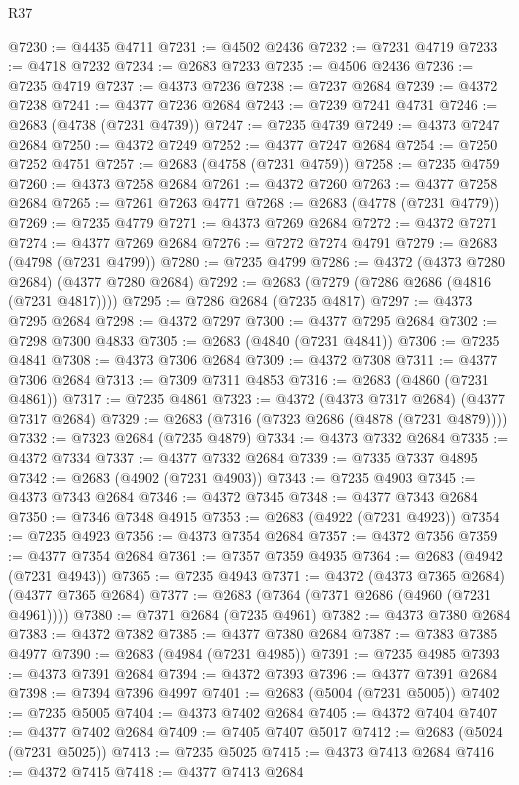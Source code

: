 \begin{lexlean}{R37}
\begin{coremodule}
@7230 := @4435 @4711
@7231 := @4502 @2436
@7232 := @7231 @4719
@7233 := @4718 @7232
@7234 := @2683 @7233
@7235 := @4506 @2436
@7236 := @7235 @4719
@7237 := @4373 @7236
@7238 := @7237 @2684
@7239 := @4372 @7238
@7241 := @4377 @7236 @2684
@7243 := @7239 @7241 @4731
@7246 := @2683 (@4738 (@7231 @4739))
@7247 := @7235 @4739
@7249 := @4373 @7247 @2684
@7250 := @4372 @7249
@7252 := @4377 @7247 @2684
@7254 := @7250 @7252 @4751
@7257 := @2683 (@4758 (@7231 @4759))
@7258 := @7235 @4759
@7260 := @4373 @7258 @2684
@7261 := @4372 @7260
@7263 := @4377 @7258 @2684
@7265 := @7261 @7263 @4771
@7268 := @2683 (@4778 (@7231 @4779))
@7269 := @7235 @4779
@7271 := @4373 @7269 @2684
@7272 := @4372 @7271
@7274 := @4377 @7269 @2684
@7276 := @7272 @7274 @4791
@7279 := @2683 (@4798 (@7231 @4799))
@7280 := @7235 @4799
@7286 := @4372 (@4373 @7280 @2684) (@4377 @7280 @2684)
@7292 := @2683 (@7279 (@7286 @2686 (@4816 (@7231 @4817))))
@7295 := @7286 @2684 (@7235 @4817)
@7297 := @4373 @7295 @2684
@7298 := @4372 @7297
@7300 := @4377 @7295 @2684
@7302 := @7298 @7300 @4833
@7305 := @2683 (@4840 (@7231 @4841))
@7306 := @7235 @4841
@7308 := @4373 @7306 @2684
@7309 := @4372 @7308
@7311 := @4377 @7306 @2684
@7313 := @7309 @7311 @4853
@7316 := @2683 (@4860 (@7231 @4861))
@7317 := @7235 @4861
@7323 := @4372 (@4373 @7317 @2684) (@4377 @7317 @2684)
@7329 := @2683 (@7316 (@7323 @2686 (@4878 (@7231 @4879))))
@7332 := @7323 @2684 (@7235 @4879)
@7334 := @4373 @7332 @2684
@7335 := @4372 @7334
@7337 := @4377 @7332 @2684
@7339 := @7335 @7337 @4895
@7342 := @2683 (@4902 (@7231 @4903))
@7343 := @7235 @4903
@7345 := @4373 @7343 @2684
@7346 := @4372 @7345
@7348 := @4377 @7343 @2684
@7350 := @7346 @7348 @4915
@7353 := @2683 (@4922 (@7231 @4923))
@7354 := @7235 @4923
@7356 := @4373 @7354 @2684
@7357 := @4372 @7356
@7359 := @4377 @7354 @2684
@7361 := @7357 @7359 @4935
@7364 := @2683 (@4942 (@7231 @4943))
@7365 := @7235 @4943
@7371 := @4372 (@4373 @7365 @2684) (@4377 @7365 @2684)
@7377 := @2683 (@7364 (@7371 @2686 (@4960 (@7231 @4961))))
@7380 := @7371 @2684 (@7235 @4961)
@7382 := @4373 @7380 @2684
@7383 := @4372 @7382
@7385 := @4377 @7380 @2684
@7387 := @7383 @7385 @4977
@7390 := @2683 (@4984 (@7231 @4985))
@7391 := @7235 @4985
@7393 := @4373 @7391 @2684
@7394 := @4372 @7393
@7396 := @4377 @7391 @2684
@7398 := @7394 @7396 @4997
@7401 := @2683 (@5004 (@7231 @5005))
@7402 := @7235 @5005
@7404 := @4373 @7402 @2684
@7405 := @4372 @7404
@7407 := @4377 @7402 @2684
@7409 := @7405 @7407 @5017
@7412 := @2683 (@5024 (@7231 @5025))
@7413 := @7235 @5025
@7415 := @4373 @7413 @2684
@7416 := @4372 @7415
@7418 := @4377 @7413 @2684

\end{coremodule}
\end{lexlean}
